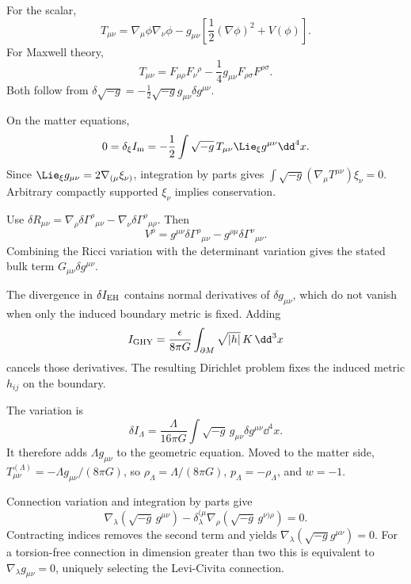 \begin{solutions}

\begin{solution}
For the scalar,
\[
T_{\mu\nu}
=\nabla_\mu\phi\nabla_\nu\phi
-g_{\mu\nu}\left[\frac12(\nabla\phi)^2+V(\phi)\right].
\]
For Maxwell theory,
\[
T_{\mu\nu}
=F_{\mu\rho}F_\nu{}^\rho
-\frac14g_{\mu\nu}F_{\rho\sigma}F^{\rho\sigma}.
\]
Both follow from
\(\delta\sqrt{-g}=-\tfrac12\sqrt{-g}g_{\mu\nu}\delta g^{\mu\nu}\).
\end{solution}

\begin{solution}
On the matter equations,
\[
0=\delta_\xi I_{\rm m}
=-\frac12\int\sqrt{-g}\,T_{\mu\nu}\Lie_\xi g^{\mu\nu}\dd^4x.
\]
Since \(\Lie_\xi g_{\mu\nu}=2\nabla_{(\mu}\xi_{\nu)}\), integration by parts
gives
\(\int\sqrt{-g}(\nabla_\mu T^{\mu\nu})\xi_\nu=0\).  Arbitrary compactly
supported \(\xi_\nu\) implies conservation.
\end{solution}

\begin{solution}
Use
\(\delta R_{\mu\nu}=\nabla_\rho\delta\Gamma^\rho{}_{\mu\nu}
-\nabla_\nu\delta\Gamma^\rho{}_{\mu\rho}\).  Then
\[
V^\rho=g^{\mu\nu}\delta\Gamma^\rho{}_{\mu\nu}
-g^{\rho\mu}\delta\Gamma^\nu{}_{\mu\nu}.
\]
Combining the Ricci variation with the determinant variation gives the stated
bulk term \(G_{\mu\nu}\delta g^{\mu\nu}\).
\end{solution}

\begin{solution}
The divergence in \(\delta I_{\rm EH}\) contains normal derivatives of
\(\delta g_{\mu\nu}\), which do not vanish when only the induced boundary
metric is fixed.  Adding
\[
I_{\rm GHY}=\frac{\epsilon}{8\pi G}
\int_{\partial M}\sqrt{|h|}\,K\,\dd^3x
\]
cancels those derivatives.  The resulting Dirichlet problem fixes the
induced metric \(h_{ij}\) on the boundary.
\end{solution}

\begin{solution}
The variation is
\[
\delta I_\Lambda
=\frac{\Lambda}{16\pi G}
\int\sqrt{-g}\,g_{\mu\nu}\delta g^{\mu\nu}\dd^4x.
\]
It therefore adds \(\Lambda g_{\mu\nu}\) to the geometric equation.  Moved to
the matter side,
\(T_{\mu\nu}^{(\Lambda)}=-\Lambda g_{\mu\nu}/(8\pi G)\), so
\(\rho_\Lambda=\Lambda/(8\pi G)\), \(p_\Lambda=-\rho_\Lambda\), and \(w=-1\).
\end{solution}

\begin{solution}
Connection variation and integration by parts give
\[
\nabla_\lambda(\sqrt{-g}\,g^{\mu\nu})
-\delta^{(\mu}_\lambda
\nabla_\rho(\sqrt{-g}\,g^{\nu)\rho})=0.
\]
Contracting indices removes the second term and yields
\(\nabla_\lambda(\sqrt{-g}g^{\mu\nu})=0\).  For a torsion-free connection in
dimension greater than two this is equivalent to
\(\nabla_\lambda g_{\mu\nu}=0\), uniquely selecting the Levi-Civita
connection.
\end{solution}


\end{solutions}
